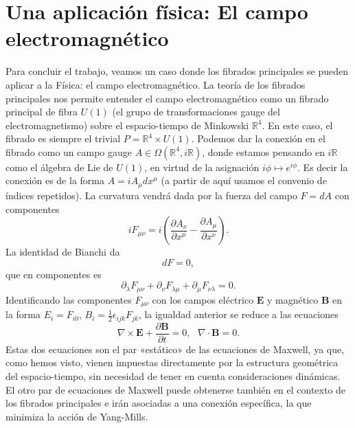 \documentclass[12pt,a4paper]{article}
\theoremstyle{definition} \newtheorem{defn}[thm]{Definición}
\theoremstyle{definition} \newtheorem{ejemplo}[thm]{Ejemplo}
\theoremstyle{definition} \newtheorem{ejercicio}[thm]{Ejercicio}
\theoremstyle{remark} \newtheorem*{obs}{Observación}
\def\RR{\mathbb{R}}
\newcommand{\ve}[1]{\mathbf{#1}}
\begin{document}
	   \section{Una aplicación física: El campo electromagnético}
Para concluir el trabajo, veamos un caso donde los fibrados principales se pueden aplicar a la Física: el campo electromagnético. La teoría de los fibrados principales nos permite entender el campo electromagnético como un fibrado principal de fibra $U(1)$ (el grupo de transformaciones gauge del electromagnetismo) sobre el espacio-tiempo de Minkowski $\RR^4$. En este caso, el fibrado es siempre el trivial $P=\RR^4\times U(1)$. Podemos dar la conexión en el fibrado como un campo gauge $A\in \Omega(\RR^4,i\RR)$, donde estamos pensando en $i\RR$ como el álgebra de Lie de $U(1)$, en virtud de la asignación $i\phi \mapsto e^{i\phi}$. Es decir la conexión es de la forma $A=iA_{\mu}dx^{\mu}$ (a partir de aquí usamos el convenio de índices repetidos). La curvatura vendrá dada por la fuerza del campo $F=dA$ con componentes
	   \begin{equation*}
	     iF_{\mu\nu}=i\left( \frac{\partial A_\nu}{\partial x^\mu}-\frac{\partial A_\mu}{\partial x^\nu} \right).
	   \end{equation*}
	   La identidad de Bianchi da
	   \begin{equation*}
	     dF=0,
	   \end{equation*}
	   que en componentes es
	   \begin{equation*}
	     \partial_\lambda F_{\mu\nu}+\partial_\nu F_{\lambda\mu}+\partial_\mu F_{\nu\lambda}=0.
	   \end{equation*}
	   Identificando las componentes $F_{\mu\nu}$ con los campos eléctrico $\ve{E}$ y magnético $\ve{B}$ en la forma $E_i=F_{i0}$, $B_i=\frac{1}{2}\epsilon_{ijk}F_{jk}$, la igualdad anterior se reduce a las ecuaciones
	   \begin{equation*}
	     \nabla \times \ve{E}+ \frac{\partial \ve{B}}{\partial t}=0,\  \ \ \nabla \cdot \ve{B}=0.
	   \end{equation*}
	   Estas dos ecuaciones son el par «estático» de las ecuaciones de Maxwell, ya que, como hemos visto, vienen impuestas directamente por la estructura geométrica del espacio-tiempo, sin necesidad de tener en cuenta consideraciones dinámicas. El otro par de ecuaciones de Maxwell puede obtenerse también en el contexto de los fibrados principales e irán asociadas a una conexión específica, la que minimiza la acción de Yang-Mills.
\end{document}
